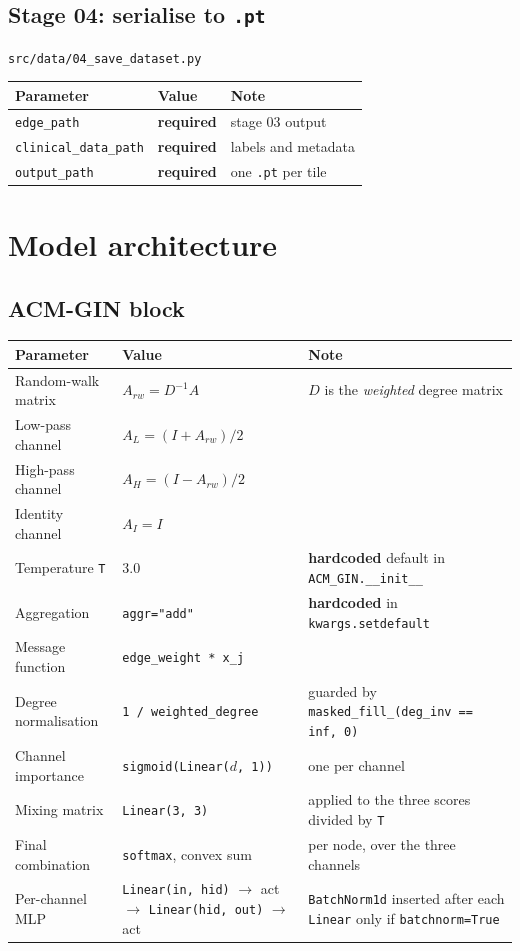 \documentclass[10pt,a4paper]{article}
\newcommand{\req}{\textcolor{eosin}{\textbf{required}}}
\newcommand{\hc}{\textcolor{haem}{\textbf{hardcoded}}}
\begin{document}
\subsection{Stage 04: serialise to \texttt{.pt}}
\noindent\texttt{src/data/04\_save\_dataset.py}

\begin{longtable}{@{}p{4.6cm}p{3.4cm}p{7.6cm}@{}}
\toprule
\textbf{Parameter} & \textbf{Value} & \textbf{Note} \\
\midrule \endhead
\texttt{edge\_path} & \req & stage 03 output \\
\texttt{clinical\_data\_path} & \req & labels and metadata \\
\texttt{output\_path} & \req & one \texttt{.pt} per tile \\
\bottomrule
\end{longtable}

\newpage
\section{Model architecture}

\subsection{ACM-GIN block}

\begin{longtable}{@{}p{4.6cm}p{4.2cm}p{6.8cm}@{}}
\toprule
\textbf{Parameter} & \textbf{Value} & \textbf{Note} \\
\midrule \endhead
Random-walk matrix & $A_{rw} = D^{-1}A$ & $D$ is the \emph{weighted} degree matrix \\
Low-pass channel & $A_L = (I + A_{rw})/2$ & \\
High-pass channel & $A_H = (I - A_{rw})/2$ & \\
Identity channel & $A_I = I$ & \\
Temperature \texttt{T} & 3.0 & \hc{} default in \texttt{ACM\_GIN.\_\_init\_\_} \\
Aggregation & \texttt{aggr="add"} & \hc{} in \texttt{kwargs.setdefault} \\
Message function & \texttt{edge\_weight * x\_j} & \\
Degree normalisation & \texttt{1 / weighted\_degree} & guarded by \texttt{masked\_fill\_(deg\_inv == inf, 0)} \\
Channel importance & \texttt{sigmoid(Linear($d$, 1))} & one per channel \\
Mixing matrix & \texttt{Linear(3, 3)} & applied to the three scores divided by \texttt{T} \\
Final combination & \texttt{softmax}, convex sum & per node, over the three channels \\
Per-channel MLP & \texttt{Linear(in, hid)} $\rightarrow$ act $\rightarrow$ \texttt{Linear(hid, out)} $\rightarrow$ act & \texttt{BatchNorm1d} inserted after each \texttt{Linear} only if \texttt{batchnorm=True} \\
\bottomrule
\end{longtable}
\end{document}
